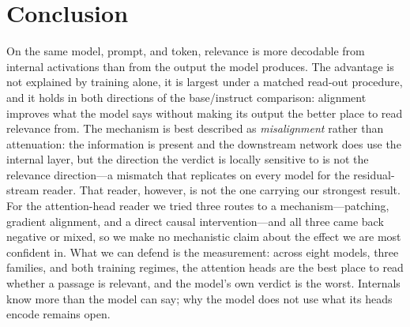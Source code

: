 \documentclass[11pt]{article}
\begin{document}
\section{Conclusion}
On the same model, prompt, and token, relevance is more decodable from internal
activations than from the output the model produces. The advantage is not
explained by training alone, it is largest under a matched read-out procedure,
and it holds in both directions of the base/instruct comparison: alignment
improves what the model says without making its output the better place to
read relevance from. The mechanism is best described as \emph{misalignment}
rather than attenuation: the information is present and the downstream network
does use the internal layer, but the direction the verdict is locally sensitive
to is not the relevance direction---a mismatch that replicates on every model
for the residual-stream reader. That reader, however, is not the one carrying our
strongest result. For the attention-head reader we tried three routes to a
mechanism---patching, gradient alignment, and a direct causal intervention---and
all three came back negative or mixed, so we make no mechanistic claim about the
effect we are most confident in. What we can defend is the measurement: across
eight models, three families, and both training regimes, the attention heads are
the best place to read whether a passage is relevant, and the model's own verdict
is the worst. Internals know more than the model can say; why the model does not
use what its heads encode remains open.



\end{document}
